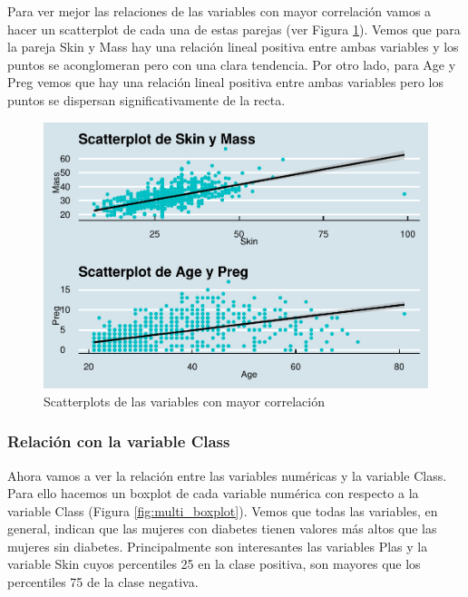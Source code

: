 \documentclass[
]{article}
\begin{document}
Para ver mejor las relaciones de las variables con mayor correlación
vamos a hacer un scatterplot de cada una de estas parejas (ver Figura
\ref{fig:scatter}). Vemos que para la pareja Skin y Mass hay una
relación lineal positiva entre ambas variables y los puntos se
aconglomeran pero con una clara tendencia. Por otro lado, para Age y
Preg vemos que hay una relación lineal positiva entre ambas variables
pero los puntos se dispersan significativamente de la recta.

\begin{figure}

{\centering \includegraphics[width=0.5\linewidth]{pima-clasificacion_files/figure-latex/scatter-1} 

}

\caption{Scatterplots de las variables con mayor correlación}\label{fig:scatter}
\end{figure}

\hypertarget{relaciuxf3n-con-la-variable-class}{%
\subsubsection{Relación con la variable
Class}\label{relaciuxf3n-con-la-variable-class}}

Ahora vamos a ver la relación entre las variables numéricas y la
variable Class. Para ello hacemos un boxplot de cada variable numérica
con respecto a la variable Class (Figura \ref{fig:multi_boxplot}). Vemos
que todas las variables, en general, indican que las mujeres con
diabetes tienen valores más altos que las mujeres sin diabetes.
Principalmente son interesantes las variables Plas y la variable Skin
cuyos percentiles 25 en la clase positiva, son mayores que los
percentiles 75 de la clase negativa.
\end{document}
